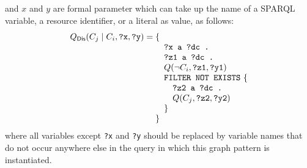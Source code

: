 \documentclass[a4paper]{article}
\newcounter{ex}
\begin{document}
and $x$ and $y$ are formal parameter which can take up the name of a SPARQL
variable, a resource identifier, or a literal as value, as follows:
\begin{equation}
  Q_{\mathsf{Dis}}(C_j \mid C_i, \mbox{\tt ?x}, \mbox{\tt ?y}) =
  \begin{minipage}[t]{5in}
    \begin{tabbing}
      \quad\=\quad\=\quad\=\kill
      \{\\
      \>\texttt{?x a ?dc .}\\
      \>\texttt{?z1 a ?dc . }\\
      \>$Q(\neg C_i, \mbox{\tt ?z1}, \mbox{\tt ?y1})$\\
      \>\texttt{FILTER NOT EXISTS} \{\\
      \>\>\texttt{?z2 a ?dc . }\\
      \>\>$Q(C_j, \mbox{\tt ?z2}, \mbox{\tt ?y2})$\\
      \>\}\\
      \}
    \end{tabbing}
  \end{minipage}
\end{equation}
where all variables except \texttt{?x} and \texttt{?y} should be replaced by
variable names that do not occur anywhere else in the query in which this
graph pattern is instantiated.
\end{document}
